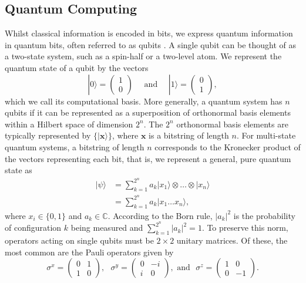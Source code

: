 \subsection{Quantum Computing}

    Whilst classical information is encoded in bits, we express quantum information in quantum bits, often referred to as qubits \cite{schumacher1995quantum}. A single qubit can be thought of as a two-state system, such as a spin-half or a two-level atom. We represent the quantum state of a qubit by the vectors 
    $$|0\rangle=\begin{pmatrix}1\\0\end{pmatrix} \quad \text{ and } \quad |1\rangle = \begin{pmatrix}0\\1\end{pmatrix},$$
    which we call its computational basis. More generally, a quantum system has $n$ qubits if it can be represented as a superposition of orthonormal basis elements within a Hilbert space of dimension $2^n$. The $2^n$ orthonormal basis elements are typically represented by $\{|\mathbf{x}\rangle\}$, where $\mathbf{x}$ is a bitstring of length $n$. For multi-state quantum systems, a bitstring of length $n$ corresponds to the Kronecker product of the vectors representing each bit, that is, we represent a general, pure quantum state as
    \begin{align}
        |\psi\rangle &= \sum^{2^n}_{k=1}a_k|x_1\rangle \otimes\dots\otimes|x_n\rangle \nonumber \\
        &= \sum^{2^n}_{k=1}a_k|x_1\dots x_n\rangle,
    \end{align}
    where $x_i\in \{0,1\}$ and $a_k\in \mathbb{C}$. According to the Born rule, $|a_k|^2$ is the probability of configuration $k$ being measured and $\sum^{2^n}_{k=1}|a_k|^2=1$. To preserve this norm, operators acting on single qubits must be $2\times2$ unitary matrices. Of these, the most common are the Pauli operators given by 
    \begin{equation}\sigma^x = \begin{pmatrix} 0 & 1 \\ 1 & 0 \end{pmatrix}, \, \, \, \, \sigma^y = \begin{pmatrix} 0 & -i \\ i & 0 \end{pmatrix}, \text{ and} \, \, \, \, \sigma^z = \begin{pmatrix} 1 & 0 \\ 0 & -1\end{pmatrix}.\end{equation}

